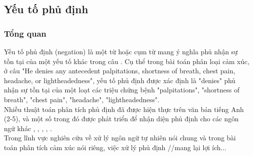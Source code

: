 \subsection{Yếu tố phủ định}
\subsubsection*{Tổng quan}
Yếu tố phủ định (negation) là một từ hoặc cụm từ mang ý nghĩa phủ nhận sự tồn tại của một yếu tố khác trong câu \cite{skeppstedt2016marker}. Cụ thể trong bài toán phân loại cảm xúc, ở câu "He denies any antecedent palpitations, shortness of breath, chest pain, headache, or lightheadedness", yếu tố phủ định được xác định là "denies" phủ nhận sự tồn tại của một loạt các triệu chứng bệnh "palpitations", "shortness of breath", "chest pain", "headache", "lightheadedness".  \\

Nhiều thuật toán phân tích phủ định đã được hiện thực trên văn bản tiếng Anh (2-5)\cite{Chapman2013}, \cite{Zeng2007} và một số trong đó được phát triển để nhận diện phủ định cho các ngôn ngữ khác \cite{costumero2014an}, \cite{benamara2012how}, \cite{gindl2006negation}, \cite{Chapman2013}, \cite{CruzDiaz2015}. \\


Trong lĩnh vực nghiên cứu về xử lý ngôn ngữ tự nhiên nói chung và trong bài toán phân tích cảm xúc nói riêng, việc xử lý phủ định //mang lại lợi ích... \\
\cite{liu2012sentiment}\cite{marsland2015machine}\cite{Giachanou2016}\cite{ali2013can}\cite{taboada2011lexicon}\cite{niu2006using}\cite{ohana2009sentiment}